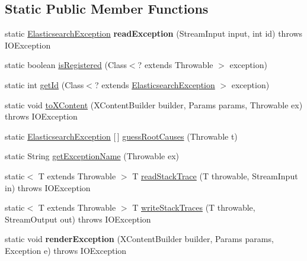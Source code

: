 \subsection*{Static Public Member Functions}
\begin{DoxyCompactItemize}
\item 
\hypertarget{classorg_1_1elasticsearch_1_1_elasticsearch_exception_abfbb6b125f0ab0bcbb5f5bb080c2421c}{}\label{classorg_1_1elasticsearch_1_1_elasticsearch_exception_abfbb6b125f0ab0bcbb5f5bb080c2421c} 
static \hyperlink{classorg_1_1elasticsearch_1_1_elasticsearch_exception}{Elasticsearch\+Exception} {\bfseries read\+Exception} (Stream\+Input input, int id)  throws I\+O\+Exception 
\item 
static boolean \hyperlink{classorg_1_1elasticsearch_1_1_elasticsearch_exception_ab1d7b8b3886de9c733b6822408e118bf}{is\+Registered} (Class$<$? extends Throwable $>$ exception)
\item 
static int \hyperlink{classorg_1_1elasticsearch_1_1_elasticsearch_exception_aba2a26f7f9671d79bdd82f9c7de2bab7}{get\+Id} (Class$<$? extends \hyperlink{classorg_1_1elasticsearch_1_1_elasticsearch_exception}{Elasticsearch\+Exception} $>$ exception)
\item 
static void \hyperlink{classorg_1_1elasticsearch_1_1_elasticsearch_exception_a872e01b6335d7cffbe11ed3e6e9a4875}{to\+X\+Content} (X\+Content\+Builder builder, Params params, Throwable ex)  throws I\+O\+Exception 
\item 
static \hyperlink{classorg_1_1elasticsearch_1_1_elasticsearch_exception}{Elasticsearch\+Exception} \mbox{[}$\,$\mbox{]} \hyperlink{classorg_1_1elasticsearch_1_1_elasticsearch_exception_ad110e49bea5a310698f156fec22defcf}{guess\+Root\+Causes} (Throwable t)
\item 
static String \hyperlink{classorg_1_1elasticsearch_1_1_elasticsearch_exception_ac4f280f6f47ba5ba899ab0ec859253c3}{get\+Exception\+Name} (Throwable ex)
\item 
static$<$ T extends Throwable $>$ T \hyperlink{classorg_1_1elasticsearch_1_1_elasticsearch_exception_a5f0e567c795fbee6a3e7f475f0e88863}{read\+Stack\+Trace} (T throwable, Stream\+Input in)  throws I\+O\+Exception 
\item 
static$<$ T extends Throwable $>$ T \hyperlink{classorg_1_1elasticsearch_1_1_elasticsearch_exception_a22de3652428c7858c91a58c7d225a158}{write\+Stack\+Traces} (T throwable, Stream\+Output out)  throws I\+O\+Exception 
\item 
\hypertarget{classorg_1_1elasticsearch_1_1_elasticsearch_exception_ada161378a2ad7cd15936c42967e84274}{}\label{classorg_1_1elasticsearch_1_1_elasticsearch_exception_ada161378a2ad7cd15936c42967e84274} 
static void {\bfseries render\+Exception} (X\+Content\+Builder builder, Params params, Exception e)  throws I\+O\+Exception 
\end{DoxyCompactItemize}
